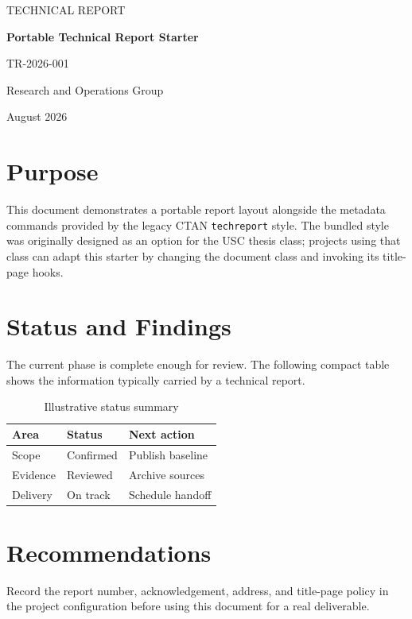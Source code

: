 \documentclass[a4paper,11pt]{report}
\begin{document}
\begin{titlepage}
  \centering
  \vspace*{2cm}
  {\Large TECHNICAL REPORT\par}
  \vspace{1.5cm}
  {\huge\bfseries Portable Technical Report Starter\par}
  \vspace{1cm}
  {\large TR-2026-001\par}
  \vfill
  Research and Operations Group\par
  August 2026
\end{titlepage}

\chapter{Purpose}
This document demonstrates a portable report layout alongside the metadata
commands provided by the legacy CTAN \texttt{techreport} style. The bundled
style was originally designed as an option for the USC thesis class; projects
using that class can adapt this starter by changing the document class and
invoking its title-page hooks.

\chapter{Status and Findings}
The current phase is complete enough for review. The following compact table
shows the information typically carried by a technical report.

\begin{table}[ht]
  \centering
  \caption{Illustrative status summary}
  \begin{tabular}{lll}
    \toprule
    Area & Status & Next action \\
    \midrule
    Scope & Confirmed & Publish baseline \\
    Evidence & Reviewed & Archive sources \\
    Delivery & On track & Schedule handoff \\
    \bottomrule
  \end{tabular}
\end{table}

\chapter{Recommendations}
Record the report number, acknowledgement, address, and title-page policy in
the project configuration before using this document for a real deliverable.
\end{document}
